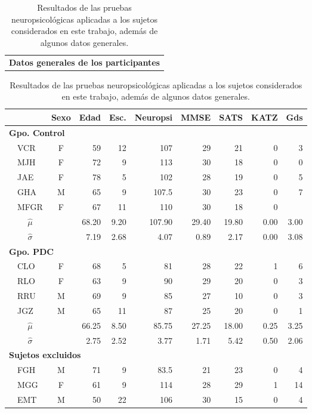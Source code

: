 \begin{table}
\centering
{}
\begin{tabular}{c}
\textbf{Datos generales de los participantes}
\vspace{1em}
\end{tabular}
\begin{small}
\begin{tabular}{llcrrrrrrr}
\toprule
 \phantom{mm}&
 & \textbf{Sexo} & \textbf{Edad} & \textbf{Esc.} & \textbf{Neuropsi} & \textbf{MMSE} & \textbf{SATS} & \textbf{KATZ} & \textbf{Gds} \\
\midrule
\multicolumn{6}{l}{\textbf{Gpo. Control}}\\
&VCR    & F    & 59   & 12   & 107      & 29   & 21   & 0    & 3 \\
&MJH    & F    & 72   & 9    & 113      & 30   & 18   & 0    & 0 \\
&JAE    & F    & 78   & 5    & 102      & 28   & 19   & 0    & 5 \\
&GHA    & M    & 65   & 9    & 107.5    & 30   & 23   & 0    & 7 \\
&MFGR   & F    & 67   & 11   & 110      & 30   & 18   & 0    &   \\
\rowcolor{gris}
&\multicolumn{1}{c}{$\widehat{\mu}$} & 
              & 68.20& 9.20 & 107.90   & 29.40& 19.80& 0.00 & 3.00\\
\rowcolor{gris}
&\multicolumn{1}{c}{$\widehat{\sigma}$} & 
              & 7.19 & 2.68 & 4.07     & 0.89 & 2.17 & 0.00 & 3.08\\
\midrule
\multicolumn{6}{l}{\textbf{Gpo. PDC}}\\
&CLO    & F    & 68   & 5    & 81       & 28   & 22   & 1    & 6 \\
&RLO    & F    & 63   & 9    & 90       & 29   & 20   & 0    & 3 \\
&RRU    & M    & 69   & 9    & 85       & 27   & 10   & 0    & 3 \\
&JGZ    & M    & 65   & 11   & 87       & 25   & 20   & 0    & 1 \\
\rowcolor{gris}
&\multicolumn{1}{c}{$\widehat{\mu}$} & 
              & 66.25& 8.50 & 85.75   & 27.25& 18.00& 0.25 & 3.25\\
\rowcolor{gris}
&\multicolumn{1}{c}{$\widehat{\sigma}$} & 
              & 2.75 & 2.52 & 3.77    & 1.71 & 5.42 & 0.50 & 2.06\\
\midrule
\multicolumn{6}{l}{\textbf{Sujetos excluidos}}\\
&FGH    & M    & 71   & 9    & 83.5     & 21   & 23   & 0    & 4  \\
&MGG    & F    & 61   & 9    & 114      & 28   & 29   & 1    & 14 \\
&EMT    & M    & 50   & 22   & 106      & 30   & 15   & 0    & 4  \\
\bottomrule
\end{tabular} 
\end{small}
\label{tab_sujetos}
\caption{Resultados de las pruebas neuropsicol\'ogicas aplicadas a los sujetos considerados en este 
trabajo, adem\'as de algunos datos generales. 
}
\end{table}

